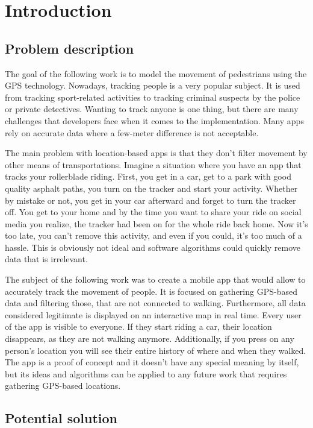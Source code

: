 \chapter{Introduction}

\section{Problem description}

The goal of the following work is to model the movement of pedestrians using the GPS technology. Nowadays, tracking people is a very popular subject. It is used from tracking sport-related activities to tracking criminal suspects by the police or private detectives. Wanting to track anyone is one thing, but there are many challenges that developers face when it comes to the implementation. Many apps rely on accurate data where a few-meter difference is not acceptable.

The main problem with location-based apps is that they don’t filter movement by other means of transportations. Imagine a situation where you have an app that tracks your rollerblade riding. First, you get in a car, get to a park with good quality asphalt paths, you turn on the tracker and start your activity. Whether by mistake or not, you get in your car afterward and forget to turn the tracker off. You get to your home and by the time you want to share your ride on social media you realize, the tracker had been on for the whole ride back home. Now it’s too late, you can’t remove this activity, and even if you could, it’s too much of a hassle. This is obviously not ideal and software algorithms could quickly remove data that is irrelevant.

The subject of the following work was to create a mobile app that would allow to accurately track the movement of people. It is focused on gathering GPS-based data and filtering those, that are not connected to walking. Furthermore, all data considered legitimate is displayed on an interactive map in real time. Every user of the app is visible to everyone. If they start riding a car, their location disappears, as they are not walking anymore. Additionally, if you press on any person’s location you will see their entire history of where and when they walked. The app is a proof of concept and it doesn’t have any special meaning by itself, but its ideas and algorithms can be applied to any future work that requires gathering GPS-based locations.

\section{Potential solution}

